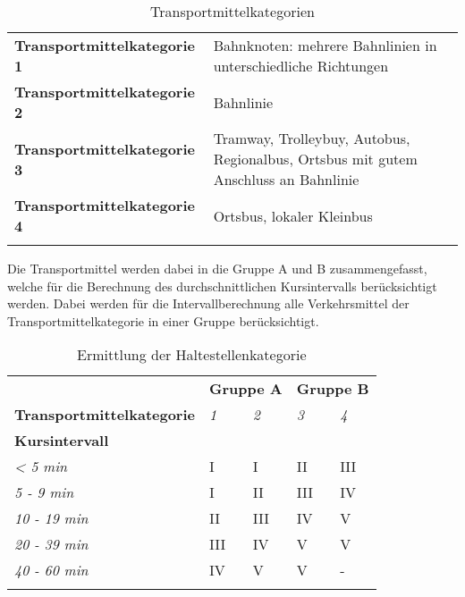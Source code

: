 \begin{longtable}{l p{10.6cm}}
        \midrule
        \textbf{Transportmittelkategorie 1}
                                    & Bahnknoten: mehrere Bahnlinien in unterschiedliche Richtungen\\
        \textbf{Transportmittelkategorie 2}
                                    & Bahnlinie\\
        \textbf{Transportmittelkategorie 3}
                                    & Tramway, Trolleybuy, Autobus, Regionalbus, Ortsbus mit gutem Anschluss an Bahnlinie\\
        \textbf{Transportmittelkategorie 4}
                                    & Ortsbus, lokaler Kleinbus\\
        \bottomrule
    \caption{Transportmittelkategorien}
    \label{table:Transportmittelkategorien}
\end{longtable}

Die Transportmittel werden dabei in die Gruppe A und B zusammengefasst, welche für die Berechnung des durchschnittlichen Kursintervalls berücksichtigt werden.
Dabei werden für die Intervallberechnung alle Verkehrsmittel der Transportmittelkategorie in einer Gruppe berücksichtigt.

\begin{longtable}[c]{l | p{2.3cm} p{2.3cm} | p{2.3cm} p{2.3cm}}
        \midrule
        \textbf{}
                                & \multicolumn{2}{l|}{\textbf{Gruppe A}}
                                & \multicolumn{2}{l}{\textbf{Gruppe B}}\\
        \textbf{Transportmittelkategorie}
                                & \textit{1}
                                & \textit{2}
                                & \textit{3}
                                & \textit{4}\\
        \textbf{Kursintervall}
                                &
                                &
                                &
                                &\\
        \textit{< 5 min}
                                & I
                                & I
                                & II
                                & III\\
        \textit{5 - 9 min}
                                & I
                                & II
                                & III
                                & IV\\
        \textit{10 - 19 min}
                                & II
                                & III
                                & IV
                                & V\\
        \textit{20 - 39 min}
                                & III
                                & IV
                                & V
                                & V\\
        \textit{40 - 60 min}
                                & IV
                                & V
                                & V
                                & -\\
        \bottomrule
    \caption{Ermittlung der Haltestellenkategorie}
    \label{table:Ermittlung der Haltestellenkategorie}
\end{longtable}


